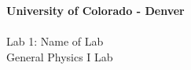 
\begin{center}
	\Large
	\textbf{University of Colorado - Denver}\\
	\vspace{2in}
	\hrulefill \\
	\vspace{.25cm}
	\huge
	Lab 1: Name of Lab\\
	\vspace{.25cm}
	\Large
	General Physics I Lab\\
	\vspace{.25cm}
	\hrulefill
	\vspace{.25cm}
	
	
	
	
	
	\newpage
\end{center}

